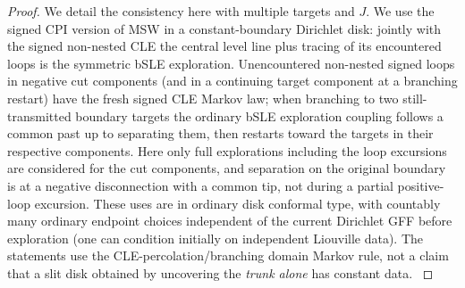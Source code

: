 \begin{proof}\leavevmode

We detail the consistency here with multiple targets and \(J\).
We use the signed CPI version of MSW in a constant-boundary Dirichlet disk: jointly with the signed non-nested CLE the central level line plus tracing of its encountered loops is the symmetric bSLE exploration.
Unencountered non-nested signed loops in negative cut components (and in a continuing target component at a branching restart) have the fresh signed CLE Markov law; when branching to two still-transmitted boundary targets the ordinary bSLE exploration coupling follows a common past up to separating them, then restarts toward the targets in their respective components.
Here only full explorations including the loop excursions are considered for the cut components, and separation on the original boundary is at a negative disconnection with a common tip, not during a partial positive-loop excursion.
These uses are in ordinary disk conformal type, with countably many ordinary endpoint choices independent of the current Dirichlet GFF before exploration (one can condition initially on independent Liouville data).
The statements use the CLE-percolation/branching domain Markov rule, not a claim that a slit disk obtained by uncovering the \emph{trunk alone} has constant data. \citep[Proposition~5.3]{MSWTrunk}


\end{proof}
